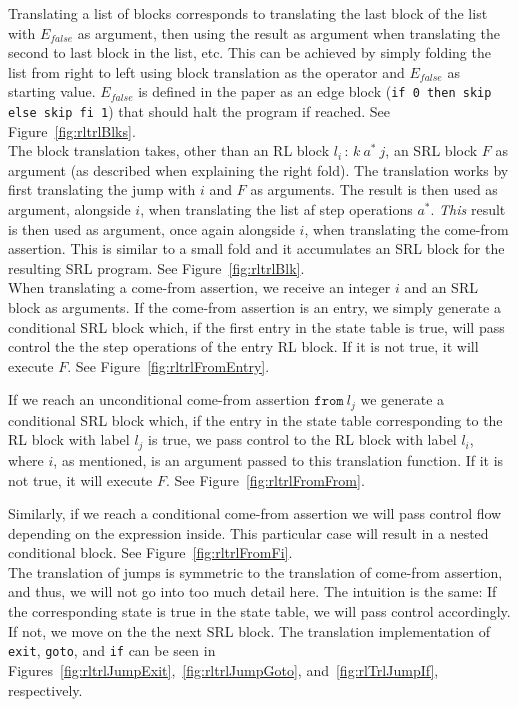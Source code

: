 \noindent Translating a list of blocks corresponds to translating the last block of the list with $E_{false}$ as argument, then using the result as argument when translating the second to last block in the list, etc. This can be achieved by simply folding the list from right to left using block translation as the operator and $E_{false}$ as starting value. $E_{false}$ is defined in the paper as an edge block (\texttt{if 0 then skip else skip fi 1}) that should halt the program if reached. See Figure~\ref{fig:rltrlBlks}.\\

\noindent The block translation takes, other than an RL block $l_i \, : \, k \ a^* \ j$, an SRL block $F$ as argument (as described when explaining the right fold). The translation works by first translating the jump with $i$ and $F$ as arguments. The result is then used as argument, alongside $i$, when translating the list af step operations $a^*$. \textit{This} result is then used as argument, once again alongside $i$, when translating the come-from assertion. This is similar to a small fold and it accumulates an SRL block for the resulting SRL program. See Figure~\ref{fig:rltrlBlk}.\\

\noindent When translating a come-from assertion, we receive an integer $i$ and an SRL block as arguments. If the come-from assertion is an entry, we simply generate a conditional SRL block which, if the first entry in the state table is true, will pass control the the step operations of the entry RL block. If it is not true, it will execute $F$. See Figure~\ref{fig:rltrlFromEntry}.

If we reach an unconditional come-from assertion $\texttt{from} \ l_j$ we generate a conditional SRL block which, if the entry in the state table corresponding to the RL block with label $l_j$ is true, we pass control to the RL block with label $l_i$, where $i$, as mentioned, is an argument passed to this translation function. If it is not true, it will execute $F$. See Figure~\ref{fig:rltrlFromFrom}.

Similarly, if we reach a conditional come-from assertion we will pass control flow depending on the expression inside. This particular case will result in a nested conditional block. See Figure~\ref{fig:rltrlFromFi}.\\

\noindent The translation of jumps is symmetric to the translation of come-from assertion, and thus, we will not go into too much detail here. The intuition is the same: If the corresponding state is true in the state table, we will pass control accordingly. If not, we move on the the next SRL block. The translation implementation of \texttt{exit}, \texttt{goto}, and \texttt{if} can be seen in Figures~\ref{fig:rltrlJumpExit},~\ref{fig:rltrlJumpGoto}, and~\ref{fig:rlTrlJumpIf}, respectively.

